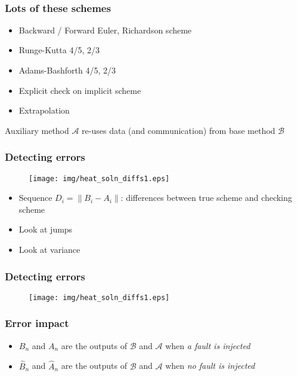 \documentclass{beamer}
\newcommand{\A}{\mathcal{A}}
\newcommand{\B}{\mathcal{B}}
\begin{document}
\begin{frame}
[Fehlberg, 1969] \\
[Dormand and Prince, 1980]

%
\begin{frame}
\frametitle{Lots of these schemes}

\begin{itemize}
\item Backward / Forward Euler, Richardson scheme
\item Runge-Kutta 4/5, 2/3
\item Adams-Bashforth 4/5, 2/3
\item Explicit check on implicit scheme
\item Extrapolation
\end{itemize}

\begin{center}
Auxiliary method $\A$ re-uses data (and communication) from base method $\B$
\end{center}

\end{frame}

%
\begin{frame}
\frametitle{Detecting errors}

\begin{figure}
  \centering
  \texttt{[image: img/heat\_soln\_diffs1.eps]}
\end{figure}

\begin{itemize}
\item Sequence $D_i = \| B_i - A_i \|$: differences between true scheme and checking scheme
\item Look at jumps
\item Look at variance
\end{itemize}

\end{frame}

\begin{frame}
\frametitle{Detecting errors}

\begin{figure}
  \centering
  \texttt{[image: img/heat\_soln\_diffs1.eps]}
\end{figure}


\end{frame}


%
\begin{frame}
\frametitle{Error impact}

\begin{itemize}
\item $B_n$ and $A_n$ are the outputs of $\B$ and $\A$ when \emph{a fault is injected}
\item $\hat{B}_n$ and $\hat{A}_n$ are the outputs of $\B$ and $\A$ when \emph{no fault is injected}
\end{itemize}


\end{frame}
\end{frame}
\end{document}
